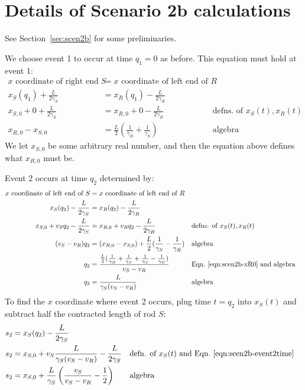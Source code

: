 \documentclass[a4paper]{article}
\theoremstyle{plain}
\theoremstyle{definition}
\begin{document}
\section{Details of Scenario 2b calculations}
\label{app:scen2b}

See Section~\ref{sec:scen2b} for some preliminaries.

We choose event 1 to occur at time $q_1=0$ as before.
This equation must hold at event 1:
\begin{align}
\text{$x$ coordinate of right end of $S$} & = \text{$x$ coordinate of left end of $R$} \nonumber \\
x_S(q_1) + \frac{L}{2\gamma_S} & = x_R(q_1) - \frac{L}{2\gamma_R} \nonumber \\
x_{S,0} + 0 + \frac{L}{2\gamma_S} & = x_{R,0} + 0 - \frac{L}{2\gamma_R} & & \text{defns. of $x_S(t), x_R(t)$} \nonumber \\
x_{R,0} - x_{S,0} & = \frac{L}{2} ( \frac{1}{\gamma_R} + \frac{1}{\gamma_S} ) & & \text{algebra} \label{eqn:scen2b-xR0}
\end{align}
We let $x_{S,0}$ be some arbitrary real number, and then the equation
above defines what $x_{R,0}$ must be.

Event 2 occurs at time $q_2$ determined by:
\begin{align}
\text{$x$ coordinate of left end of $S$} & = \text{$x$ coordinate of left end of $R$} \nonumber \\
x_S(q_2) - \frac{L}{2\gamma_S} & = x_R(q_2) - \frac{L}{2\gamma_R} \nonumber \\
x_{S,0} + v_S q_2 - \frac{L}{2\gamma_S} & = x_{R,0} + v_R q_2 - \frac{L}{2\gamma_R} & & \text{defns. of $x_S(t), x_R(t)$} \nonumber \\
(v_S - v_R) q_2 & = (x_{R,0} - x_{S,0}) + \frac{L}{2} ( \frac{1}{\gamma_S} - \frac{1}{\gamma_R} ) & & \text{algebra} \nonumber \\
q_2 & = \frac{ \frac{L}{2} ( \frac{1}{\gamma_R} + \frac{1}{\gamma_S} + \frac{1}{\gamma_S} - \frac{1}{\gamma_R})}{v_S - v_R} & & \text{Eqn.~\eqref{eqn:scen2b-xR0} and algebra} \nonumber \\
q_2 & = \frac{L}{\gamma_S(v_S - v_R)} & & \text{algebra} \label{eqn:scen2b-event2time}
\end{align}
To find the $x$ coordinate where event 2 occurs, plug time $t=q_2$
into $x_S(t)$ and subtract half the contracted length of rod $S$:
\begin{align}
s_2 & = x_S(q_2) - \frac{L}{2\gamma_S} \nonumber \\
s_2 & = x_{S,0} + v_S \frac{L}{\gamma_S(v_S - v_R)} - \frac{L}{2\gamma_S} & & \text{defn. of $x_S(t)$ and Eqn.~\eqref{eqn:scen2b-event2time}} \nonumber \\
s_2 & = x_{S,0} + \frac{L}{\gamma_S} \left( \frac{v_S}{v_S - v_R} - \frac{1}{2} \right) & & \text{algebra} \label{eqn:scen2b-event2xcoord}
\end{align}
\end{document}
